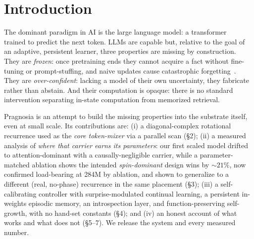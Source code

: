 \documentclass[11pt]{article}
\begin{document}
\section{Introduction}
The dominant paradigm in AI is the large language model: a transformer~\cite{vaswani2017} trained to predict the next token. LLMs are capable but, relative to the goal of an adaptive, persistent learner, three properties are missing by construction. They are \emph{frozen}: once pretraining ends they cannot acquire a fact without fine-tuning or prompt-stuffing, and naive updates cause catastrophic forgetting~\cite{mccloskey1989}. They are \emph{over-confident}: lacking a model of their own uncertainty, they fabricate rather than abstain. And their computation is opaque: there is no standard intervention separating in-state computation from memorized retrieval.

Pragnosia is an attempt to build the missing properties into the substrate itself, even at small scale. Its contributions are: (i) a diagonal-complex rotational recurrence used as the \emph{core token-mixer} via a parallel scan (\S2); (ii) a measured analysis of \emph{where that carrier earns its parameters}: our first scaled model drifted to attention-dominant with a causally-negligible carrier, while a parameter-matched ablation shows the intended \emph{spin-dominant} design wins by ${\sim}21\%$, now confirmed load-bearing at 284M by ablation, and shown to generalize to a different (real, no-phase) recurrence in the same placement (\S3); (iii) a self-calibrating controller with surprise-modulated continual learning, a persistent in-weights episodic memory, an introspection layer, and function-preserving self-growth, with no hand-set constants (\S4); and (iv) an honest account of what works and what does not (\S5--7). We release the system and every measured number.
\end{document}
